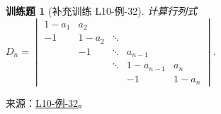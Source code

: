\documentclass[12pt,fontset=fandol]{ctexart}
\newtheorem{exercise}{训练题}[section]
\begin{document}
\begin{exercise}[补充训练 L10-例-32]\label{prob:L10-例-32}
计算行列式$D_n=\begin{vmatrix}
            1-a_{1} & a_{2}   &        &           &         \\
            -1      & 1-a_{2} & \ddots &           &         \\
                    & -1      & \ddots & a_{n-1}   &         \\
                    &         & \ddots & 1-a_{n-1} & a_{n}   \\
                    &         &        & -1        & 1-a_{n}
        \end{vmatrix}$.
\end{exercise}
\noindent 来源：\href{https://github.com/yhwu-is/Linear-Algebra-Left-Undone/blob/new/%E8%AE%B2%E4%B9%89/%E4%B8%93%E9%A2%98/10%20%E8%A1%8C%E5%88%97%E5%BC%8F.tex}{L10-例-32}。
\end{document}
